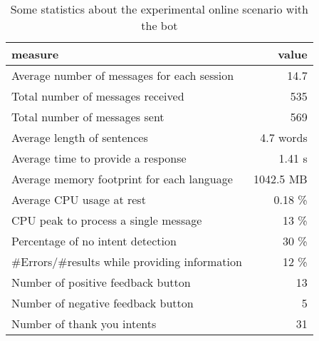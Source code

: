 
\begin{table}
  \begin{tabularx}{\textwidth}{Xr}
    \toprule
    \textbf{measure} & \textbf{value} \\
    \midrule
    Average number of messages for each session & 14.7 \\
    Total number of messages received & 535 \\
    Total number of messages sent & 569 \\
    Average length of sentences & 4.7 words \\
    Average time to provide a response & 1.41 s \\
    Average memory footprint for each language & 1042.5 MB \\
    Average CPU usage at rest & 0.18 \% \\
    CPU peak to process a single message & 13 \% \\
    Percentage of no intent detection & 30 \% \\
    \#Errors/\#results while providing information & 12 \% \\
    Number of positive feedback button & 13 \\
    Number of negative feedback button & 5 \\
    Number of thank you intents & 31 \\
    \bottomrule
  \end{tabularx}
  \caption{Some statistics about the experimental online scenario with the bot}\label{tab:botStatistics}
\end{table}